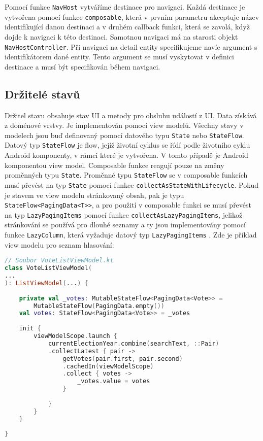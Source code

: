 \noindent Pomocí funkce \lstinline|NavHost| vytváříme destinace pro navigaci. Každá destinace je vytvořena pomocí funkce \lstinline|composable|, která v prvním parametru akceptuje název identifikující danou destinaci \linebreak a v druhém callback funkci, která se zavolá,  když dojde k navigaci k této destinaci. Samotnou navigaci má na starosti objekt \lstinline|NavHostController|. Při navigaci na detail entity specifikujeme navíc argument s identifikátorem dané entity. Tento argument se musí vyskytovat v definici destinace a musí být specifikován během navigaci.

\subsection*{Držitelé stavů}
Držitel stavu obsahuje stav UI a metody pro obsluhu událostí z UI. Data získává z doménové vrstvy. Je implementován pomocí view modelů. Všechny stavy v modelech jsou buď definovaný pomocí datového typu \lstinline|State| nebo \lstinline|StateFlow|. Datový typ \lstinline|StateFlow| je flow, jejíž životní cyklus se řídí podle životního cyklu Android komponenty, v rámci které je vytvořena. V tomto případě je Android komponentou view model. Composable funkce reagují pouze na změny proměnných typu \lstinline|State|. Proměnné typu \lstinline|StateFlow| se v composable funkcích musí převést na typ \lstinline|State| pomocí funkce \lstinline|collectAsStateWithLifecycle|. Pokud je stavem ve view modelu stránkovaný obsah, pak je typu \lstinline|StateFlow<PagingData<T>>|, a pro použití v composable funkci se musí převést na typ \lstinline|LazyPagingItems| pomocí funkce \lstinline|collectAsLazyPagingItems|, jelikož stránkování se používá pro dlouhé seznamy a ty jsou implementovány pomocí funkce \lstinline|LazyColumn|, která vyžaduje datový typ \lstinline|LazyPagingItems| \cite{compose-paging}. Zde je příklad view modelu pro seznam hlasování:

\begin{lstlisting}[caption={Ukázka využití view modelu}, label={lst:view-model}, tabsize=2, language=Kotlin]
// Soubor VoteListViewModel.kt
class VoteListViewModel(
...
): ListViewModel(...) {
	
	private val _votes: MutableStateFlow<PagingData<Vote>> =
		MutableStateFlow(PagingData.empty())
	val votes: StateFlow<PagingData<Vote>> = _votes
	
	init {
		viewModelScope.launch {
			currentElectionYear.combine(searchText, ::Pair)
			.collectLatest { pair ->
				getVotes(pair.first, pair.second)
				.cachedIn(viewModelScope)
				.collect { votes ->
					_votes.value = votes
				}
				
			}
		}
	}
	
}
\end{lstlisting}

